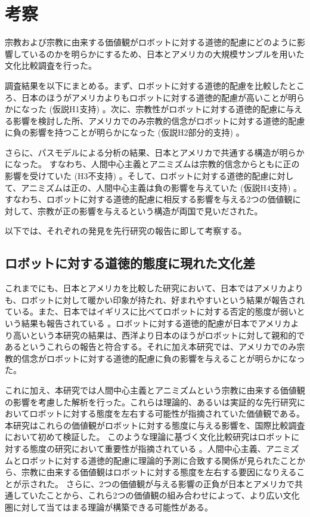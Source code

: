 \documentclass[a4j,12pt]{jreport}
\begin{document}
\section{考察}
宗教および宗教に由来する価値観がロボットに対する道徳的配慮にどのように影響しているのかを明らかにするため、日本とアメリカの大規模サンプルを用いた文化比較調査を行った。


調査結果を以下にまとめる。まず、ロボットに対する道徳的配慮を比較したところ、日本のほうがアメリカよりもロボットに対する道徳的配慮が高いことが明らかになった (仮説H1支持) 。次に、宗教性がロボットに対する道徳的配慮に与える影響を検討した所、アメリカでのみ宗教的信念がロボットに対する道徳的配慮に負の影響を持つことが明らかになった (仮説H2部分的支持) 。


さらに、パスモデルによる分析の結果、日本とアメリカで共通する構造が明らかになった。
すなわち、人間中心主義とアニミズムは宗教的信念からともに正の影響を受けていた (H3不支持) 。そして、ロボットに対する道徳的配慮に対して、アニミズムは正の、人間中心主義は負の影響を与えていた (仮説H4支持) 。すなわち、ロボットに対する道徳的配慮に相反する影響を与える2つの価値観に対して、宗教が正の影響を与えるという構造が両国で見いだされた。


以下では、それぞれの発見を先行研究の報告に即して考察する。

\subsection{ロボットに対する道徳的態度に現れた文化差}
これまでにも、日本とアメリカを比較した研究\cite{mania}において、日本ではアメリカよりも、ロボットに対して暖かい印象が持たれ、好まれやすいという結果が報告されている。また、日本ではイギリスに比べてロボットに対する否定的態度が弱いという結果も報告されている\cite{humuk} 。ロボットに対する道徳的配慮が日本でアメリカより高いという本研究の結果は、西洋より日本のほうがロボットに対して親和的であるというこれらの報告と符合する。それに加え本研究では、アメリカでのみ宗教的信念がロボットに対する道徳的配慮に負の影響を与えることが明らかになった。


これに加え、本研究では人間中心主義とアニミズムという宗教に由来する価値観の影響を考慮した解析を行った。これらは理論的\cite{mania, gygi}、あるいは実証的\cite{okanda}な先行研究においてロボットに対する態度を左右する可能性が指摘されていた価値観である。本研究はこれらの価値観がロボットに対する態度に与える影響を、国際比較調査において初めて検証した。
このような理論に基づく文化比較研究はロボットに対する態度の研究において重要性が指摘されている\cite{review} 。人間中心主義、アニミズムとロボットに対する道徳的配慮に理論的予測に合致する関係が見られたことから、宗教に由来する価値観はロボットに対する態度を左右する要因になりえることが示された。
さらに、2つの価値観が与える影響の正負が日本とアメリカで共通していたことから、これら2つの価値観の組み合わせによって、より広い文化圏に対して当てはまる理論が構築できる可能性がある。
\end{document}
